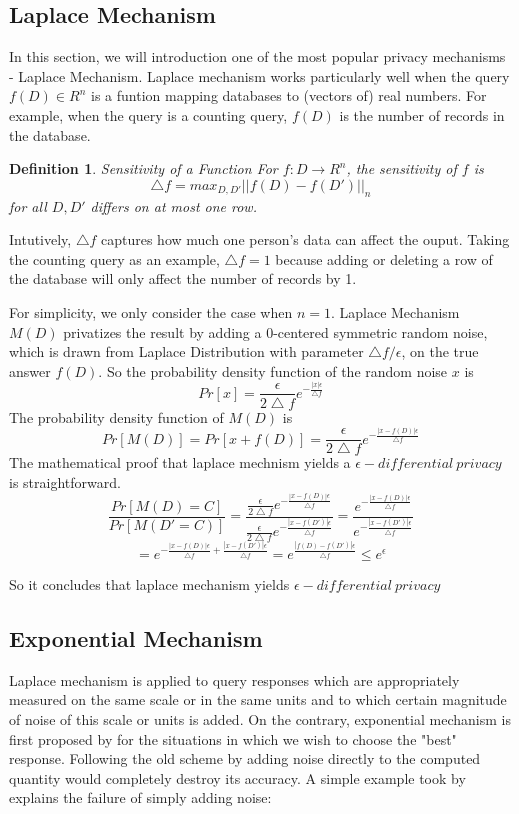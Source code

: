 \documentclass[a4paper, 11pt]{article} %
\newtheorem{definition}{Definition}[section]
\begin{document}
\subsection{Laplace Mechanism}
In this section, we will introduction one of the most popular privacy mechanisms - Laplace Mechanism\cite{dwork2006calibrating}. Laplace mechanism works particularly well when the query $f(D)\in R^n$ is a funtion mapping databases to (vectors of) real numbers. For example, when the query is a counting query, $f(D)$ is the number of records in the database.
\begin{definition}{Sensitivity of a Function}
For $f: D\rightarrow R^n$, the sensitivity of $f$ is
	\[  \bigtriangleup f = max_{D, D\prime} ||f(D) - f(D\prime)||_n \]
	for all $D, D\prime$ differs on at most one row.
\end{definition}
Intutively, $\bigtriangleup f$ captures how much one person's data can affect the ouput. Taking the counting query as an example, $\bigtriangleup f = 1$ because adding or deleting a row of the database will only affect the number of records by 1.

For simplicity, we only consider the case when $n=1$. Laplace Mechanism $M(D)$ privatizes the result by adding a 0-centered symmetric random noise, which is drawn from Laplace Distribution\cite{simon1774memoire} with parameter $\bigtriangleup f / \epsilon$,  on the true answer $f(D)$. So the probability density function of the random noise $x$ is
   \[ Pr[x] = \frac{\epsilon}{2\bigtriangleup f}e^{-\frac{|x|\epsilon}{\bigtriangleup f}}  \]
The probability density function of $M(D)$ is
  \[ Pr[M(D)] = Pr[x+f(D)] = \frac{\epsilon}{2\bigtriangleup f}e^{-\frac{|x-f(D)|\epsilon}{\bigtriangleup f}}  \]
  The mathematical proof that laplace mechnism yields a $\epsilon - differential \ privacy$ is straightforward.
  \[ \frac{Pr[M(D) = C]}{Pr[M(D\prime = C)]} = \frac{\frac{\epsilon}{2\bigtriangleup f}e^{-\frac{|x-f(D)|\epsilon}{\bigtriangleup f}} }{\frac{\epsilon}{2\bigtriangleup f}e^{-\frac{|x-f(D\prime)|\epsilon}{\bigtriangleup f}} } = \frac{e^{-\frac{|x-f(D)|\epsilon}{\bigtriangleup f}} }{e^{-\frac{|x-f(D\prime)|\epsilon}{\bigtriangleup f}} } \] \[= e^{-\frac{|x-f(D)|\epsilon}{\bigtriangleup f} + \frac{|x-f(D\prime)|\epsilon}{\bigtriangleup f} } = e^{\frac{|f(D) - f(D\prime)|\epsilon}{\bigtriangleup f}} \leq e^\epsilon \]

So it concludes that laplace mechanism yields $\epsilon - differential \ privacy$

\subsection{Exponential Mechanism}
Laplace mechanism is applied to query responses which are appropriately measured on the same scale or in the same units and to which certain magnitude of noise of this scale or units is added. On the contrary, exponential mechanism is first proposed by \cite{mcsherry2007mechanism} for the situations  in which we wish to choose the "best" response. Following the old scheme by adding noise directly to the computed quantity would completely destroy its accuracy. A simple example took by \cite{dwork2014algorithmic} explains the failure of simply adding noise:
\end{document}
